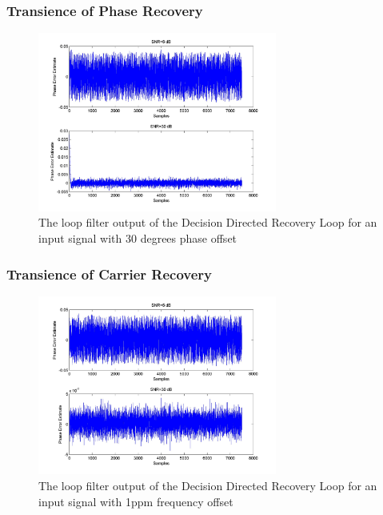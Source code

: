 \documentclass[]{article}
\begin{document}
\subsubsection{Transience of Phase Recovery}
\begin{figure}[H]
\centering
\hspace*{-2cm}\includegraphics[width=0.7\textwidth]{qpLoopFilterpo_ddr1.jpg}
\caption{The loop filter output of the Decision Directed Recovery Loop for an input signal with 30 degrees phase offset \label{fig:ddrTransphase}}
\end{figure}

\subsubsection{Transience of Carrier Recovery}
\begin{figure}[H]
\centering
\hspace*{-2cm}\includegraphics[width=0.7\textwidth]{qpLoopFilterfo_ddr1.jpg}
\caption{The loop filter output of the Decision Directed Recovery Loop for an input signal with 1ppm frequency offset \label{fig:ddrtransFreq1}}
\end{figure}
\end{document}
